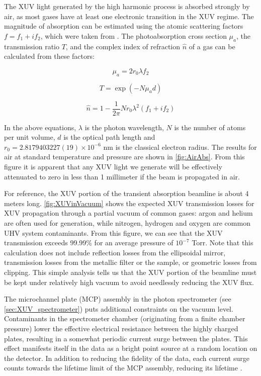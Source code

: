 The XUV light generated by the high harmonic process is absorbed strongly by air, as most gases have at least one electronic transition in the XUV regime. The magnitude of absorption can be estimated using the atomic scattering factors $f = f_1 + i f_2$, which were taken from \cite{henkeXRayInteractionsPhotoabsorption1993}. The photoabsorption cross section $\mu_a$, the transmission ratio $T$, and the complex index of refraction $\hat{n}$ of a gas can be calculated from these factors:

\begin{equation}
\mu_a = 2 r_0 \lambda f_2
\label{eqn:PhotoCrossSection}
\end{equation}

\begin{equation}
T = \exp\left( -N \mu_a d \right)
\label{eqn:BeersLaw}
\end{equation}

\begin{equation}
\hat{n} = 1 - \frac{1}{2 \pi} N r_0 \lambda^2 \left(f_1 + i f_2\right)
\label{eqn:IndexfromASF}
\end{equation}

In the above equations, $\lambda$ is the photon wavelength, $N$ is the number of atoms per unit volume, $d$ is the optical path length and $r_0=2.8179403227(19) \times 10^{-6} \text{ nm}$ is the classical electron radius. The results for air at standard temperature and pressure are shown in \cref{fig:AirAbs}. From this figure it is apparent that any XUV light we generate will be effectively attenuated to zero in less than 1 millimeter if the beam is propagated in air.

For reference, the XUV portion of the transient absorption beamline is about 4 meters long. \cref{fig:XUVinVacuum} shows the expected XUV transmission losses for XUV propagation through a partial vacuum of common gases: argon and helium are often used for generation, while nitrogen, hydrogen and oxygen are common UHV system contaminants. From this figure, we can see that the XUV transmission exceeds 99.99\% for an average pressure of $10^{-7}$ Torr. Note that this calculation does not include reflection losses from the ellipsoidal mirror, transmission losses from the metallic filter or the sample, or geometric losses from clipping. This simple analysis tells us that the XUV portion of the beamline must be kept under relatively high vacuum to avoid needlessly reducing the XUV flux.

The microchannel plate (MCP) assembly in the photon spectrometer (see \cref{sec:XUV_spectrometer}) puts additional constraints on the vacuum level.  Contaminants in the spectrometer chamber (originating from a finite chamber pressure) lower the effective electrical resistance between the highly charged plates, resulting in a somewhat periodic current surge between the plates. This effect manifests itself in the data as a bright point source at a random location on the detector. In addition to reducing the fidelity of the data, each current surge counts towards the lifetime limit of the MCP assembly, reducing its lifetime \cite{ladislaswizaMicrochannelPlateDetectors1979}.


